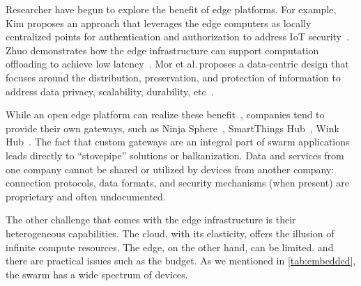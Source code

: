Researcher have begun to explore the benefit of edge platforms. For example, Kim
proposes an approach that leverages the edge computers as locally centralized
points for authentication and authorization to address IoT
security~\cite{kim2017securing}. Zhuo demonstrates how the edge infrastructure
can support computation offloading to achieve low
latency~\cite{chen2018application}. Mor et al.\,proposes a data-centric design
that focuses around the distribution, preservation, and protection of
information to address data privacy, scalability, durability,
etc~\cite{mor2016toward}.

While an open edge platform can realize these
benefit~\cite{zachariah1001internet}, companies tend to provide their own
gateways, such as Ninja Sphere~\cite{ninja}, SmartThings Hub~\cite{smartthings},
Wink Hub~\cite{wink}. The fact that custom gateways are an integral part of
swarm applications leads directly to ``stovepipe'' solutions or
balkanization. Data and services from one company cannot be shared or utilized
by devices from another company: connection protocols, data formats, and
security mechanisms (when present) are proprietary and often undocumented.

The other challenge that comes with the edge infrastructure is their
heterogeneous capabilities. The cloud, with its elasticity, offers the illusion
of infinite compute resources. The edge, on the other hand, can be limited. and
there are practical issues such as the budget. As we mentioned in
\autoref{tab:embedded}, the swarm has a wide spectrum of devices.


